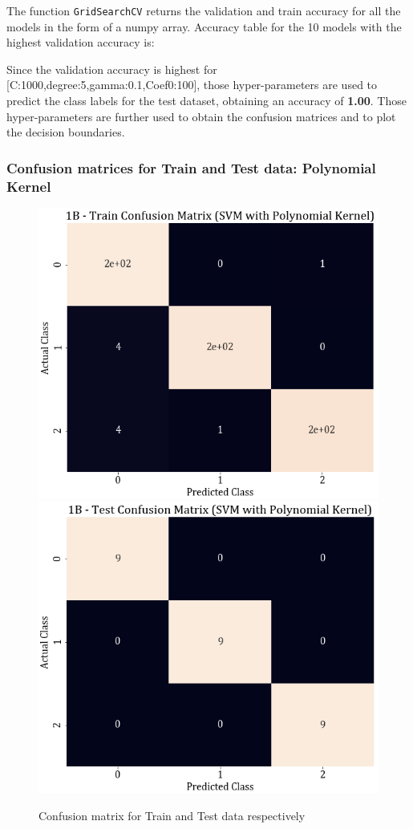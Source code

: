 \documentclass[11pt,a4paper]{article}
\newcommand{\noi}{\noindent}
\def\tt#1{\texttt{#1}}
\begin{document}
\noi
The function \tt{GridSearchCV} returns the validation and train accuracy for all the models in the form of a numpy array. Accuracy table for the 10 models with the highest validation accuracy is: 


\noi
Since the validation accuracy is highest for [C:1000,degree:5,gamma:0.1,Coef0:100], those hyper-parameters are used to predict the class labels for the test dataset, obtaining an accuracy of \textbf{1.00}. Those hyper-parameters are further used to obtain the confusion matrices and to plot the decision boundaries. 

\subsubsection{Confusion matrices for Train and Test data: Polynomial Kernel}

\begin{figure}[H]
    \centering
    \includegraphics[scale=0.4]{images/1B_SVM_poly_train_confmat.png}
    \includegraphics[scale=0.4]{images/1B_SVM_poly_Test_confmat.png}
    \caption{Confusion matrix for Train and Test data respectively}
\end{figure}
\end{document}
